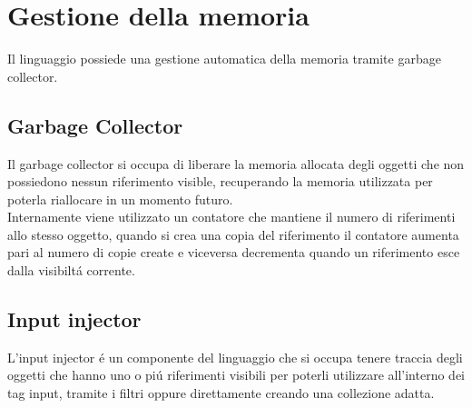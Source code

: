 \section{Gestione della memoria}
Il linguaggio possiede una gestione automatica della memoria tramite garbage collector.

\subsection{Garbage Collector}
Il garbage collector si occupa di liberare la memoria allocata degli oggetti
che non possiedono nessun riferimento visible, recuperando la memoria utilizzata
per poterla riallocare in un momento futuro. \\ 
Internamente viene utilizzato un contatore che mantiene il numero di riferimenti 
allo stesso oggetto, quando si crea una copia del riferimento il contatore aumenta
pari al numero di copie create e viceversa decrementa quando un riferimento 
esce dalla visibiltá corrente.

\subsection{Input injector}
L'input injector é un componente del linguaggio che si occupa tenere traccia degli
oggetti che hanno uno o piú riferimenti visibili per poterli utilizzare all'interno 
dei tag input, tramite i filtri oppure direttamente creando una collezione adatta. 